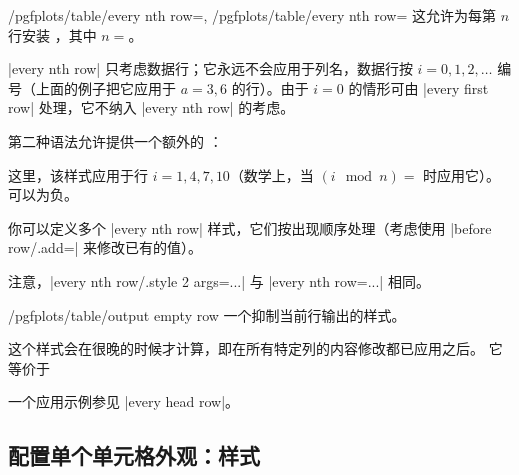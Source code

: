 \documentclass[a4paper,doc2]{ltxdoc}
\begin{document}
\begin{keylist}{%
    /pgfplots/table/every nth row=,
    /pgfplots/table/every nth row=%
}
    这允许为每第 $n$ 行安装 ，其中 $n=$。
\begin{codeexample}[]
\end{codeexample}
    |every nth row| 只考虑数据行；它永远不会应用于列名，数据行按 $i=0,1,2,\dotsc$
    编号（上面的例子把它应用于 $a = 3,6$ 的行）。由于 $i=0$ 的情形可由
    |every first row| 处理，它不纳入 |every nth row| 的考虑。

    第二种语法允许提供一个额外的 ：
\begin{codeexample}[]
\end{codeexample}
    \noindent 这里，该样式应用于行 $i=1,4,7,10$（数学上，当 $(i \mod n) = $
     时应用它）。 可以为负。

    你可以定义多个 |every nth row| 样式，它们按出现顺序处理（考虑使用
    |before row/.add=| 来修改已有的值）。

    注意，|every nth row/.style 2 args=...| 与 |every nth row=...| 相同。
\end{keylist}

\begin{stylekey}{/pgfplots/table/output empty row}
    一个抑制当前行输出的样式。

    这个样式会在很晚的时候才计算，即在所有特定列的内容修改都已应用之后。
    它等价于
\begin{codeexample}
\end{codeexample}

    一个应用示例参见 |every head row|。
\end{stylekey}


\subsection{配置单个单元格外观：样式}
\end{document}
